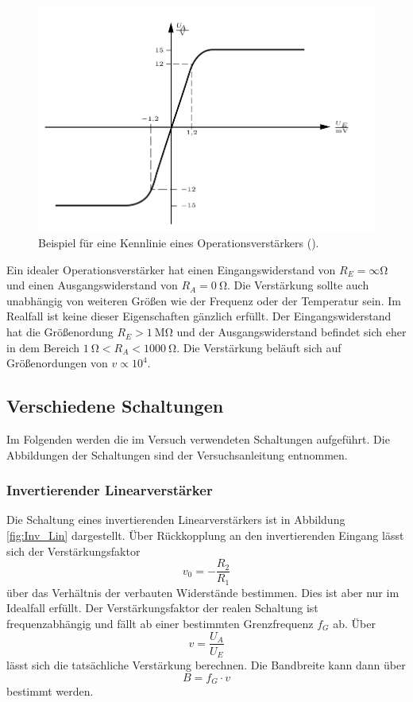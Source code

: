 \begin{figure}
    \centering 
    \includegraphics[width=.8\textwidth]{Bilder/Kennlinie.PNG}
    \caption{Beispiel für eine Kennlinie eines Operationsverstärkers (\cite[S.~99]{Clausert}).}
    \label{fig:Kennlinie}
\end{figure}

Ein idealer Operationsverstärker hat einen Eingangswiderstand von $R_E=\infty \si{\ohm}$ und einen Ausgangswiderstand von $R_A=\SI{0}{\ohm}$.
Die Verstärkung sollte auch unabhängig von weiteren Größen wie der Frequenz oder der Temperatur sein.
Im Realfall ist keine dieser Eigenschaften gänzlich erfüllt.
Der Eingangswiderstand hat die Größenordung $R_E > \SI{1}{\mega\ohm}$ und der Ausgangswiderstand befindet sich eher in dem Bereich $\SI{1}{\ohm} < R_A < \SI{1000}{\ohm}$.
Die Verstärkung beläuft sich auf Größenordungen von $v \propto 10^4$.



\subsection{Verschiedene Schaltungen}
Im Folgenden werden die im Versuch verwendeten Schaltungen aufgeführt.
Die Abbildungen der Schaltungen sind der Versuchsanleitung \cite{V51} entnommen.

\subsubsection{Invertierender Linearverstärker}
Die Schaltung eines invertierenden Linearverstärkers ist in Abbildung \ref{fig:Inv_Lin} dargestellt.
Über Rückkopplung an den invertierenden Eingang lässt sich der Verstärkungsfaktor
\begin{equation}
v_0 =-\frac{R_2}{R_1}    
\end{equation} 
über das Verhältnis der verbauten Widerstände bestimmen.
Dies ist aber nur im Idealfall erfüllt.
Der Verstärkungsfaktor der realen Schaltung ist frequenzabhängig und fällt ab einer bestimmten Grenzfrequenz $f_G$ ab.
Über 
\begin{equation}
    v = \frac{U_A}{U_E}
\end{equation}
lässt sich die tatsächliche Verstärkung berechnen.
Die Bandbreite kann dann über
\begin{equation}
    B = f_G \cdot v
\end{equation}
bestimmt werden.


